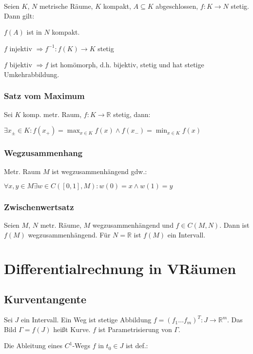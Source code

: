 Seien $K$, $N$ metrische Räume, $K$ kompakt, $A \subseteq K$ abgeschlossen, $f: K \rightarrow N$ stetig. Dann gilt:

$f(A)$ ist in $N$ kompakt.

$f$ injektiv $\Rightarrow f^{-1} : f(K) \rightarrow K$ stetig

$f$ bijektiv $\Rightarrow f$ ist homömorph, d.h. bijektiv, stetig und hat stetige Umkehrabbildung.

\subsubsection*{Satz vom Maximum}

Sei $K$ komp. metr. Raum, $f: K \rightarrow \mathbb{R}$ stetig, dann:

$\exists x_{\pm} \in K : f(x_+) = \displaystyle\max_{x \in K} f(x) \land f(x_-) = \displaystyle\min_{x \in K} f(x)$

\subsubsection*{Wegzusammenhang}

Metr. Raum $M$ ist wegzusammenhängend gdw.:

$\forall x, y \in M \exists w \in C([0,1], M) : w(0) = x \land w(1) = y$

\subsubsection*{Zwischenwertsatz}

Seien $M$, $N$ metr. Räume, $M$ wegzusammenhängend und $f \in C(M, N)$. Dann ist $f(M)$ wegzusammenhängend. Für $N = \mathbb{R}$ ist $f(M)$ ein Intervall.

\section*{Differentialrechnung in VRäumen}

\subsection*{Kurventangente}

Sei $J$ ein Intervall. Ein Weg ist stetige Abbildung $f = (f_1 \hdots f_m)^T : J \rightarrow \mathbb{R}^m$. Das Bild $\Gamma = f(J)$ heißt Kurve. $f$ ist Parametrisierung von $\Gamma$.

Die Ableitung eines $C^1$-Wegs $f$ in $t_0 \in J$ ist def.:

